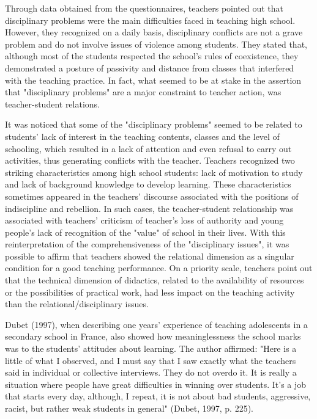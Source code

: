 \documentclass[11pt, a4paper]{article}
\begin{document}
Through data obtained from the questionnaires, teachers pointed out that disciplinary problems were the main difficulties
faced in teaching high school. However, they recognized on a daily basis, disciplinary conflicts are not a grave problem
and do not involve issues of violence among students. They stated that, although most of the students respected the
school's rules of coexistence, they demonstrated a posture of passivity and distance from classes that interfered with the
teaching practice. In fact, what seemed to be at stake in the assertion that "disciplinary problems" are a major constraint to
teacher action, was teacher-student relations.

It was noticed that some of the "disciplinary problems" seemed to be related to students' lack of interest in the teaching
contents, classes and the level of schooling, which resulted in a lack of attention and even refusal to carry out activities,
thus generating conflicts with the teacher. Teachers recognized two striking characteristics among high school students:
lack of motivation to study and lack of background knowledge to develop learning. These characteristics sometimes
appeared in the teachers' discourse associated with the positions of indiscipline and rebellion. In such cases, the
teacher-student relationship was associated with teachers' criticism of teacher's loss of authority and young people's lack
of recognition of the "value" of school in their lives. With this reinterpretation of the comprehensiveness of the
"disciplinary issues", it was possible to affirm that teachers showed the relational dimension as a singular condition for a
good teaching performance. On a priority scale, teachers point out that the technical dimension of didactics, related to the
availability of resources or the possibilities of practical work, had less impact on the teaching activity than the
relational/disciplinary issues.

Dubet (1997), when describing one years' experience of teaching adolescents in a secondary school in France, also
showed how meaninglessness the school marks was to the students' attitudes about learning. The author affirmed: "Here
is a little of what I observed, and I must say that I saw exactly what the teachers said in individual or collective interviews.
They do not overdo it. It is really a situation where people have great difficulties in winning over students. It's a job that
starts every day, although, I repeat, it is not about bad students, aggressive, racist, but rather weak students in general"
(Dubet, 1997, p. 225).
\end{document}
